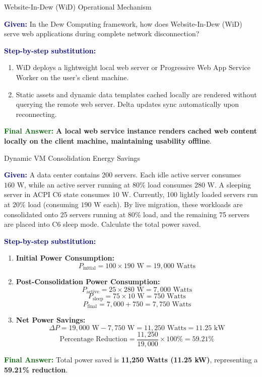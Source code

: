 \documentclass[11pt,a4paper,openany]{report}
\newcommand{\Given}{\par\textbf{\textcolor{navy}{Given:}} }
\newcommand{\Steps}{\par\textbf{\textcolor{navy}{Step-by-step substitution:}}\par}
\newcommand{\Answer}{\par\textbf{\textcolor{darkgreen}{Final Answer:}} }
\begin{document}
\begin{solved}{Website-In-Dew (WiD) Operational Mechanism}
\Given In the Dew Computing framework, how does Website-In-Dew (WiD) serve web applications during complete network disconnection?
\Steps
\begin{enumerate}[leftmargin=*]
  \item WiD deploys a lightweight local web server or Progressive Web App Service Worker on the user's client machine.
  \item Static assets and dynamic data templates cached locally are rendered without querying the remote web server. Delta updates sync automatically upon reconnecting.
\end{enumerate}
\Answer \textbf{A local web service instance renders cached web content locally on the client machine, maintaining usability offline}.
\end{solved}

\begin{solved}{Dynamic VM Consolidation Energy Savings}
\Given A data center contains 200 servers. Each idle active server consumes $160\text{ W}$, while an active server running at $80\%$ load consumes $280\text{ W}$. A sleeping server in ACPI C6 state consumes $10\text{ W}$. Currently, 100 lightly loaded servers run at $20\%$ load (consuming $190\text{ W}$ each). By live migration, these workloads are consolidated onto 25 servers running at $80\%$ load, and the remaining 75 servers are placed into C6 sleep mode. Calculate the total power saved.
\Steps
\begin{enumerate}[leftmargin=*]
  \item \textbf{Initial Power Consumption:}
  \begin{equation}
  P_{\text{initial}} = 100 \times 190\text{ W} = 19,000\text{ Watts}
  \end{equation}
  \item \textbf{Post-Consolidation Power Consumption:}
  \begin{equation}
  P_{\text{active}} = 25 \times 280\text{ W} = 7,000\text{ Watts}
  \end{equation}
  \begin{equation}
  P_{\text{sleep}} = 75 \times 10\text{ W} = 750\text{ Watts}
  \end{equation}
  \begin{equation}
  P_{\text{final}} = 7,000 + 750 = 7,750\text{ Watts}
  \end{equation}
  \item \textbf{Net Power Savings:}
  \begin{equation}
  \Delta P = 19,000\text{ W} - 7,750\text{ W} = 11,250\text{ Watts} = 11.25\text{ kW}
  \end{equation}
  \begin{equation}
  \text{Percentage Reduction} = \frac{11,250}{19,000} \times 100\% = 59.21\%
  \end{equation}
\end{enumerate}
\Answer Total power saved is \textbf{11,250 Watts (11.25 kW)}, representing a \textbf{59.21\% reduction}.
\end{solved}
\end{document}

